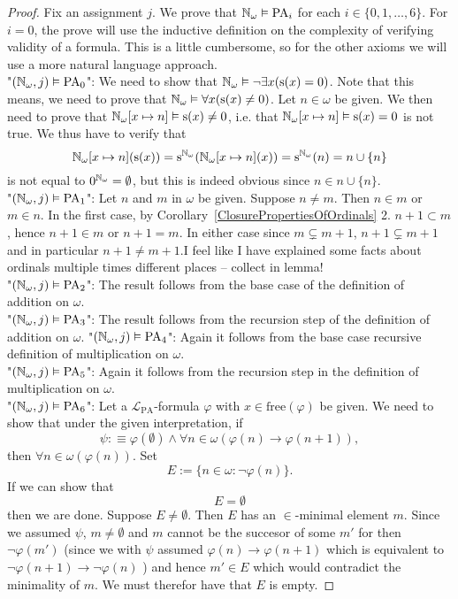 \begin{proof}
    Fix an assignment $j$. We prove that $\mathbb{N}_\omega \vDash \mathrm{PA}_i$ for each $i\in\{0,1,\dots, 6\}$. For $i=0$, the prove will use the inductive definition on the complexity of verifying validity of a formula. This is a little cumbersome, so for the other axioms we will use a more natural language approach.\\
    "$(\mathbb{N}_\omega, j) \vDash \mathrm{PA}_0$": We need to show that $\mathbb{N}_\omega \vDash \neg\exists x(\mathrm{s}(x) = 0)$. Note that this means, we need to prove that $\mathbb{N}_\omega \vDash \forall x(\mathrm{s}(x)\neq 0)$. Let $n\in \omega$ be given. We then need to prove that $\mathbb{N}_\omega[x\mapsto n]\vDash \mathrm{s}(x) \neq 0$, i.e. that $\mathbb{N}_\omega[x\mapsto n] \vDash \mathrm{s}(x) = 0$ is not true. We thus have to verify that 
    $$\mathbb{N}_\omega[x\mapsto n](\mathrm{s}(x))=\mathrm{s}^{\mathbb{N}_\omega}(\mathbb{N}_\omega[x\mapsto n](x))=\mathrm{s}^{\mathbb{N}_\omega}(n)=n\cup \{n\}$$ is not equal to $0^{\mathbb{N}_\omega} = \emptyset$, but this is indeed obvious since $n\in n\cup\{n\}$.\\
    "$(\mathbb{N}_\omega,j)\vDash\mathrm{PA}_1$": Let $n$ and $m$ in $\omega$ be given. Suppose $n\neq m$. Then $n\in m$ or $m\in n$. In the first case, by Corollary~\ref{ClosurePropertiesOfOrdinals} 2. $n+1\subset m$, hence $n+1\in m$ or $n+1=m$. In either case since $m\subsetneq m+1$, $n+1\subsetneq m+1$ and in particular $n+1 \neq m+1$.{\Large I feel like I have explained some facts about ordinals multiple times different places -- collect in lemma!}\\
    "$(\mathbb{N}_\omega,j)\vDash\mathrm{PA}_2$": The result follows from the base case of the definition of addition on $\omega$.\\
    "$(\mathbb{N}_\omega,j)\vDash\mathrm{PA}_3$": The result follows from the recursion step of the definition of addition on $\omega$.
    "$(\mathbb{N}_\omega,j)\vDash\mathrm{PA}_4$": Again it follows from the base case recursive definition of multiplication on $\omega$.\\
    "$(\mathbb{N}_\omega,j)\vDash\mathrm{PA}_5$": Again it follows from the recursion step in the definition of multiplication on $\omega$.\\
    "$(\mathbb{N}_\omega,j)\vDash\mathrm{PA}_6$": Let a $\mathcal{L}_\mathrm{PA}$-formula $\varphi$ with $x\in \mathrm{free}(\varphi)$ be given. We need to show that under the given interpretation, if 
    $$\psi:\equiv\varphi(\emptyset)\wedge \forall n\in \omega(\varphi(n)\to \varphi(n+1)),$$
    then $\forall n\in \omega( \varphi(n))$. Set 
    $$E := \{n\in \omega : \neg\varphi(n)\}.$$
    If we can show that 
    $$E = \emptyset$$
    then we are done. Suppose $E\neq \emptyset$. Then $E$ has an $\in$-minimal element $m$. Since we assumed $\psi$, $m\neq \emptyset$ and $m$ cannot be the succesor of some $m'$ for then $\neg \varphi(m')$ (since we with $\psi$ assumed $\varphi(n)\to \varphi(n+1)$ which is equivalent to $\neg\varphi(n+1)\to \neg \varphi(n)$ ) and hence $m'\in E$ which would contradict the minimality of $m$. We must therefor have that $E$ is empty. 
\end{proof}

